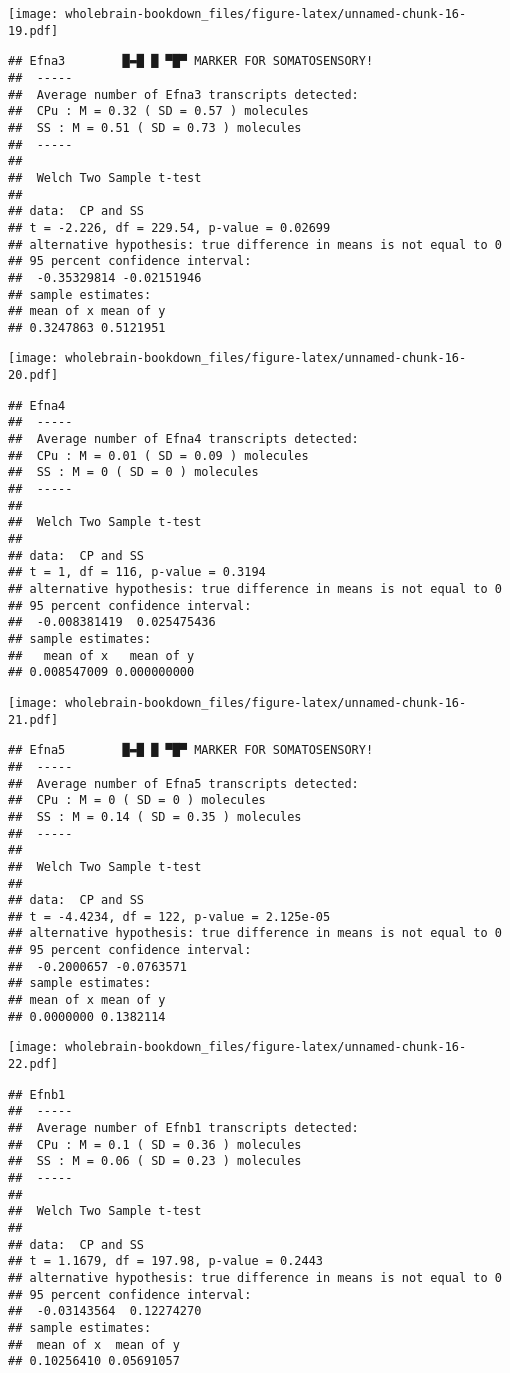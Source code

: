 \documentclass[]{book}
\theoremstyle{definition}
\theoremstyle{definition}
\theoremstyle{remark}
\begin{document}
\texttt{[image: wholebrain-bookdown\_files/figure-latex/unnamed-chunk-16-19.pdf]}

\begin{verbatim}
## Efna3        █▬█ █ ▀█▀ MARKER FOR SOMATOSENSORY!
##  -----
##  Average number of Efna3 transcripts detected:
##  CPu : M = 0.32 ( SD = 0.57 ) molecules 
##  SS : M = 0.51 ( SD = 0.73 ) molecules
##  -----
## 
##  Welch Two Sample t-test
## 
## data:  CP and SS
## t = -2.226, df = 229.54, p-value = 0.02699
## alternative hypothesis: true difference in means is not equal to 0
## 95 percent confidence interval:
##  -0.35329814 -0.02151946
## sample estimates:
## mean of x mean of y 
## 0.3247863 0.5121951
\end{verbatim}

\texttt{[image: wholebrain-bookdown\_files/figure-latex/unnamed-chunk-16-20.pdf]}

\begin{verbatim}
## Efna4
##  -----
##  Average number of Efna4 transcripts detected:
##  CPu : M = 0.01 ( SD = 0.09 ) molecules 
##  SS : M = 0 ( SD = 0 ) molecules
##  -----
## 
##  Welch Two Sample t-test
## 
## data:  CP and SS
## t = 1, df = 116, p-value = 0.3194
## alternative hypothesis: true difference in means is not equal to 0
## 95 percent confidence interval:
##  -0.008381419  0.025475436
## sample estimates:
##   mean of x   mean of y 
## 0.008547009 0.000000000
\end{verbatim}

\texttt{[image: wholebrain-bookdown\_files/figure-latex/unnamed-chunk-16-21.pdf]}

\begin{verbatim}
## Efna5        █▬█ █ ▀█▀ MARKER FOR SOMATOSENSORY!
##  -----
##  Average number of Efna5 transcripts detected:
##  CPu : M = 0 ( SD = 0 ) molecules 
##  SS : M = 0.14 ( SD = 0.35 ) molecules
##  -----
## 
##  Welch Two Sample t-test
## 
## data:  CP and SS
## t = -4.4234, df = 122, p-value = 2.125e-05
## alternative hypothesis: true difference in means is not equal to 0
## 95 percent confidence interval:
##  -0.2000657 -0.0763571
## sample estimates:
## mean of x mean of y 
## 0.0000000 0.1382114
\end{verbatim}

\texttt{[image: wholebrain-bookdown\_files/figure-latex/unnamed-chunk-16-22.pdf]}

\begin{verbatim}
## Efnb1
##  -----
##  Average number of Efnb1 transcripts detected:
##  CPu : M = 0.1 ( SD = 0.36 ) molecules 
##  SS : M = 0.06 ( SD = 0.23 ) molecules
##  -----
## 
##  Welch Two Sample t-test
## 
## data:  CP and SS
## t = 1.1679, df = 197.98, p-value = 0.2443
## alternative hypothesis: true difference in means is not equal to 0
## 95 percent confidence interval:
##  -0.03143564  0.12274270
## sample estimates:
##  mean of x  mean of y 
## 0.10256410 0.05691057
\end{verbatim}
\end{document}
